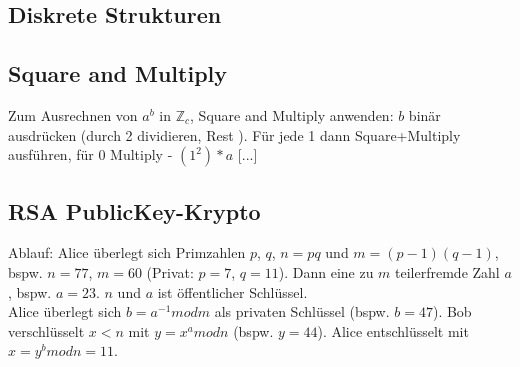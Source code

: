 \documentclass[12pt,landscape]{article}
\begin{document}
\begin{multicols}{3}
\section{Diskrete Strukturen}
\subsection{Square and Multiply}
Zum Ausrechnen von $a^b$ in $\mathbb{Z}_c$, Square and Multiply anwenden: $b$ binär ausdrücken (durch 2 dividieren, Rest ). Für jede 1 dann Square+Multiply ausführen, für 0 Multiply - $(1^2)*a$ [...]
\subsection{RSA PublicKey-Krypto}
Ablauf: Alice überlegt sich Primzahlen $p$, $q$, $n = pq$ und $m = (p - 1)(q - 1)$, bspw. $n = 77$, $m = 60$ (Privat: $p = 7$, $q = 11$). Dann eine zu $m$ teilerfremde Zahl $a$, bspw. $a = 23$. $n$ und $a$ ist öffentlicher Schlüssel.\\
Alice überlegt sich $b = a^{-1} mod m$ als privaten Schlüssel (bspw. $b = 47$).
Bob verschlüsselt $x < n$ mit $y = x^a mod n$ (bspw. $y = 44$). Alice entschlüsselt mit $x = y^b mod n = 11$.

\end{multicols}
\end{document}

